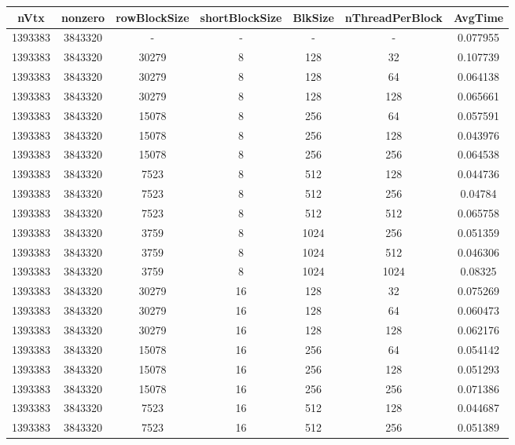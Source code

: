 \documentclass[9pt]{article}
\begin{document}
\SetBgPosition{0.25cm,-5.0cm}
\begin{tabular}{|c|c|c|c|c|c|c| }  
\hline
nVtx  & nonzero  & rowBlockSize  & shortBlockSize  & BlkSize  & nThreadPerBlock  & AvgTime \\
\hline
1393383  & 3843320  &  -  & -  & -  & -  &0.077955 \\
\hline
1393383  & 3843320  & 30279  & 8  & 128  & 32  & 0.107739 \\
\hline
1393383  & 3843320  & 30279  & 8  & 128  & 64  & 0.064138 \\
\hline
1393383  & 3843320  & 30279  & 8  & 128  & 128  & 0.065661 \\
\hline
1393383  & 3843320  & 15078  & 8  & 256  & 64  & 0.057591 \\
\hline
1393383  & 3843320  & 15078  & 8  & 256  & 128  & 0.043976 \\
\hline
1393383  & 3843320  & 15078  & 8  & 256  & 256  & 0.064538 \\
\hline
1393383  & 3843320  & 7523  & 8  & 512  & 128  & 0.044736 \\
\hline
1393383  & 3843320  & 7523  & 8  & 512  & 256  & 0.04784 \\
\hline
1393383  & 3843320  & 7523  & 8  & 512  & 512  & 0.065758 \\
\hline
1393383  & 3843320  & 3759  & 8  & 1024  & 256  & 0.051359 \\
\hline
1393383  & 3843320  & 3759  & 8  & 1024  & 512  & 0.046306 \\
\hline
1393383  & 3843320  & 3759  & 8  & 1024  & 1024  & 0.08325 \\
\hline
1393383  & 3843320  & 30279  & 16  & 128  & 32  & 0.075269 \\
\hline
1393383  & 3843320  & 30279  & 16  & 128  & 64  & 0.060473 \\
\hline
1393383  & 3843320  & 30279  & 16  & 128  & 128  & 0.062176 \\
\hline
1393383  & 3843320  & 15078  & 16  & 256  & 64  & 0.054142 \\
\hline
1393383  & 3843320  & 15078  & 16  & 256  & 128  & 0.051293 \\
\hline
1393383  & 3843320  & 15078  & 16  & 256  & 256  & 0.071386 \\
\hline
1393383  & 3843320  & 7523  & 16  & 512  & 128  & 0.044687 \\
\hline
1393383  & 3843320  & 7523  & 16  & 512  & 256  & 0.051389 \\

\end{tabular}
\end{document}

